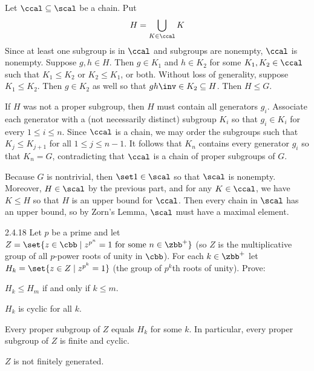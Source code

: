 \begin{solenum}
    \item Let $\ccal \subseteq \scal$ be a chain.
	Put
    \[
    	H = \bigcup_{K \in \ccal}K
    \]
    Since at least one subgroup is in $\ccal$ and subgroups are nonempty, $\ccal$ is nonempty.
	Suppose $g, h \in H$.
	Then $g \in K_1$ and $h \in K_2$ for some $K_1, K_2 \in \ccal$ such that $K_1 \leq K_2$ or $K_2 \leq K_1$, or both.
	Without loss of generality, suppose $K_1 \leq K_2$.
	Then $g \in K_2$ as well so that $gh\inv \in K_2 \subseteq H$.
	Then $H \leq G$.
    \item If $H$ was not a proper subgroup, then $H$ must contain all generators $g_i$.
	Associate each generator with a (not necessarily distinct) subgroup $K_i$ so that $g_i \in K_i$ for every $1 \leq i \leq n$.
	Since $\ccal$ is a chain, we may order the subgroups such that $K_j \leq K_{j + 1}$ for all $1 \leq j \leq n - 1$.
	It follows that $K_n$ contains every generator $g_i$ so that $K_n = G$, contradicting that $\ccal$ is a chain of proper subgroups of $G$. 
    \item Because $G$ is nontrivial, then $\set 1 \in \scal$ so that $\scal$ is nonempty.
	Moreover, $H \in \scal$ by the previous part, and for any $K \in \ccal$, we have $K \leq H$ so that $H$ is an upper bound for $\ccal$.
	Then every chain in $\scal$ has an upper bound, so by Zorn's Lemma, $\scal$ must have a maximal element.
\end{solenum}

\begin{exercise}{2.4.18} 
    Let $p$ be a prime and let $Z = \set{z\in \cbb\mid z^{p^n}=1 \text{ for some } n\in \zbb^+}$ (so $Z$ is the multiplicative group of all $p$-power roots of unity in $\cbb$).
	For each $k\in \zbb^+$ let $H_k = \set{z\in Z \mid z^{p^k}=1}$ (the group of $p^k$th roots of unity).
	Prove:
    \begin{subexercises}
        \item $H_k \leq H_m$ if and only if $k\leq m$.
        \item $H_k$ is cyclic for all $k$.
        \item Every proper subgroup of $Z$ equals $H_k$ for some $k$.  
        In particular, every proper subgroup of $Z$ is finite and cyclic.
        \item $Z$ is not finitely generated.
    \end{subexercises}
\end{exercise}

